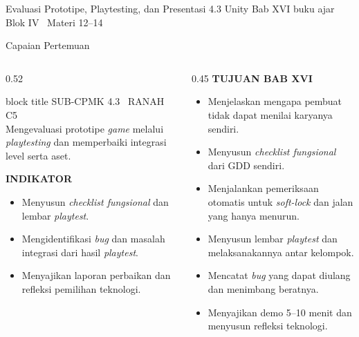 \documentclass[aspectratio=169,10pt]{beamer}
\begin{document}
  {Evaluasi Prototipe, Playtesting, dan Presentasi}
  {4.3}
  {Unity}
  {Bab XVI buku ajar}
  {Blok IV \textperiodcentered\ Materi 12--14}

\begin{frame}{Capaian Pertemuan}
\begin{columns}[T,onlytextwidth]
  \begin{column}{0.52\textwidth}
    \begin{beamercolorbox}[wd=\linewidth,sep=5pt,rounded=true]{block title}
      {\fontsize{6.8}{8}\selectfont\color{ubHead}SUB-CPMK 4.3 \textperiodcentered\ RANAH C5}\\[2pt]
      {\footnotesize Mengevaluasi prototipe \emph{game} melalui
       \emph{playtesting} dan memperbaiki integrasi level serta aset.}
    \end{beamercolorbox}
    \vspace{0.16cm}

    {\fontsize{7}{8.5}\selectfont\bfseries\color{ubAccent}INDIKATOR}\par
    \vspace{0.06cm}
    \begin{itemize}
      \item Menyusun \emph{checklist fungsional} dan lembar \emph{playtest}.
      \item Mengidentifikasi \emph{bug} dan masalah integrasi dari hasil
            \emph{playtest}.
      \item Menyajikan laporan perbaikan dan refleksi pemilihan teknologi.
    \end{itemize}
  \end{column}
  \begin{column}{0.45\textwidth}
    {\fontsize{7}{8.5}\selectfont\bfseries\color{ubAccent}TUJUAN BAB XVI}\par
    \vspace{0.08cm}
    \begin{itemize}
      \item Menjelaskan mengapa pembuat tidak dapat menilai karyanya sendiri.
      \item Menyusun \emph{checklist fungsional} dari GDD sendiri.
      \item Menjalankan pemeriksaan otomatis untuk \emph{soft-lock} dan jalan
            yang hanya menurun.
      \item Menyusun lembar \emph{playtest} dan melaksanakannya antar
            kelompok.
      \item Mencatat \emph{bug} yang dapat diulang dan menimbang beratnya.
      \item Menyajikan demo 5--10 menit dan menyusun refleksi teknologi.
    \end{itemize}
  \end{column}
\end{columns}
\end{frame}
\end{document}
